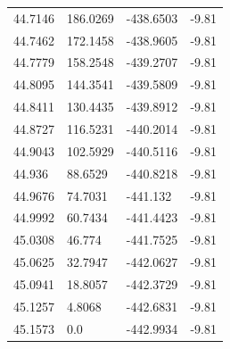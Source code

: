 \begin{table}[H]
\begin{tabular}{llll}
44.7146 & 186.0269 & -438.6503 & -9.81 \\
44.7462 & 172.1458 & -438.9605 & -9.81 \\
44.7779 & 158.2548 & -439.2707 & -9.81 \\
44.8095 & 144.3541 & -439.5809 & -9.81 \\
44.8411 & 130.4435 & -439.8912 & -9.81 \\
44.8727 & 116.5231 & -440.2014 & -9.81 \\
44.9043 & 102.5929 & -440.5116 & -9.81 \\
44.936 & 88.6529 & -440.8218 & -9.81 \\
44.9676 & 74.7031 & -441.132 & -9.81 \\
44.9992 & 60.7434 & -441.4423 & -9.81 \\
45.0308 & 46.774 & -441.7525 & -9.81 \\
45.0625 & 32.7947 & -442.0627 & -9.81 \\
45.0941 & 18.8057 & -442.3729 & -9.81 \\
45.1257 & 4.8068 & -442.6831 & -9.81 \\
45.1573 & 0.0 & -442.9934 & -9.81 \\
\bottomrule
\end{tabular}

\end{table}
